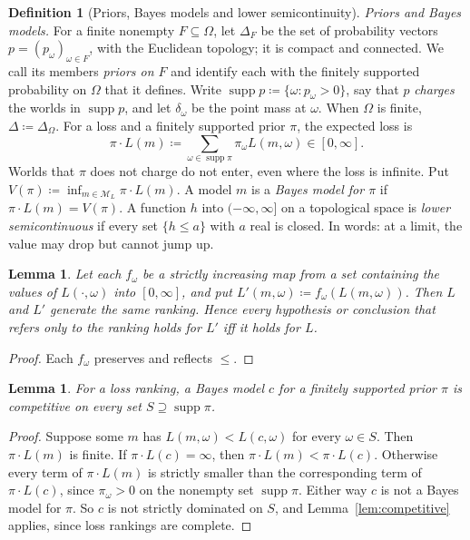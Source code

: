 \documentclass[11pt]{article}
\newtheorem{lemma}[theorem]{Lemma}
\theoremstyle{definition}
\newtheorem{definition}[theorem]{Definition}
\theoremstyle{remark}
\newcommand{\M}{\mathcal M}
\newcommand{\supp}{\operatorname{supp}}
\begin{document}
\begin{definition}[Priors, Bayes models and lower semicontinuity]\label{def:bayes}
\emph{Priors and Bayes models.} For a finite nonempty $F\subseteq\Omega$, let $\Delta_F$ be the set of probability vectors $p=(p_\omega)_{\omega\in F}$, with the Euclidean topology; it is compact and connected. We call its members \emph{priors on $F$} and identify each with the finitely supported probability on $\Omega$ that it defines. Write $\supp p\coloneqq\{\omega:p_\omega>0\}$, say that $p$ \emph{charges} the worlds in $\supp p$, and let $\delta_\omega$ be the point mass at $\omega$. When $\Omega$ is finite, $\Delta\coloneqq\Delta_\Omega$. For a loss and a finitely supported prior $\pi$, the expected loss is
\[
\pi\cdot L(m)\coloneqq\sum_{\omega\in\supp\pi}\pi_\omega L(m,\omega)\in[0,\infty].
\]
Worlds that $\pi$ does not charge do not enter, even where the loss is infinite. Put $V(\pi)\coloneqq\inf_{m\in\M_L}\pi\cdot L(m)$. A model $m$ is a \emph{Bayes model for $\pi$} if $\pi\cdot L(m)=V(\pi)$. A function $h$ into $(-\infty,\infty]$ on a topological space is \emph{lower semicontinuous} if every set $\{h\le a\}$ with $a$ real is closed. In words: at a limit, the value may drop but cannot jump up.
\end{definition}

\begin{lemma}\label{lem:rescale}
Let each $f_\omega$ be a strictly increasing map from a set containing the values of $L(\cdot,\omega)$ into $[0,\infty]$, and put $L'(m,\omega)\coloneqq f_\omega(L(m,\omega))$. Then $L$ and $L'$ generate the same ranking. Hence every hypothesis or conclusion that refers only to the ranking holds for $L'$ iff it holds for $L$.
\end{lemma}
\begin{proof}
Each $f_\omega$ preserves and reflects $\le$.
\end{proof}

\begin{lemma}\label{lem:bayes-competitive}
For a loss ranking, a Bayes model $c$ for a finitely supported prior $\pi$ is competitive on every set $S\supseteq\supp\pi$.
\end{lemma}
\begin{proof}
Suppose some $m$ has $L(m,\omega)<L(c,\omega)$ for every $\omega\in S$. Then $\pi\cdot L(m)$ is finite. If $\pi\cdot L(c)=\infty$, then $\pi\cdot L(m)<\pi\cdot L(c)$. Otherwise every term of $\pi\cdot L(m)$ is strictly smaller than the corresponding term of $\pi\cdot L(c)$, since $\pi_\omega>0$ on the nonempty set $\supp\pi$. Either way $c$ is not a Bayes model for $\pi$. So $c$ is not strictly dominated on $S$, and Lemma~\ref{lem:competitive} applies, since loss rankings are complete.
\end{proof}
\end{document}
